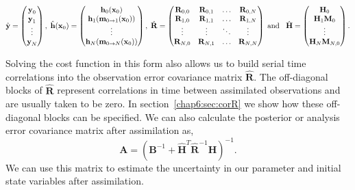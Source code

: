 \begin{equation}
\hat{\textbf{y}}=
\begin{pmatrix}
\textbf{y}_0 \\
\textbf{y}_1\\
\vdots \\
\textbf{y}_N
\end{pmatrix},
\hspace{1mm}
\hat{\textbf{h}}(\textbf{x}_0)=
\begin{pmatrix}
\textbf{h}_0(\textbf{x}_0) \\
\textbf{h}_1(\textbf{m}_{0\rightarrow 1}(\mathbf{x}_{0}))\\
\vdots \\
\textbf{h}_N(\textbf{m}_{0\rightarrow N}(\mathbf{x}_{0}))
\end{pmatrix},
\hspace{1mm}
\hat{\mathbf{R}}=
\begin{pmatrix}
\mathbf{R}_{0, 0} & \mathbf{R}_{0, 1} & \dots & \mathbf{R}_{0, N} \\
\mathbf{R}_{1, 0} & \mathbf{R}_{1, 1} & \dots & \mathbf{R}_{1, N} \\
\vdots & \vdots & \ddots & \vdots \\
\mathbf{R}_{N, 0} & \mathbf{R}_{N, 1} & \dots & \mathbf{R}_{N, N}
\end{pmatrix}
\hspace{1mm} \text{and} \hspace{3mm}
\hat{\mathbf{H}}=
\begin{pmatrix}
\mathbf{H}_0 \\
\mathbf{H}_1\mathbf{M}_0\\
\vdots \\
\mathbf{H}_N\mathbf{M}_{N,0}
\end{pmatrix}.
\end{equation}

Solving the cost function in this form also allows us to build serial time correlations into the observation error covariance matrix $\hat{\mathbf{R}}$. The off-diagonal blocks of $\hat{\mathbf{R}}$ represent correlations in time between assimilated observations and are usually taken to be zero. In section~\ref{chap6:sec:corR} we show how these off-diagonal blocks can be specified. We can also calculate the posterior or analysis error covariance matrix after assimilation as,
\begin{equation}
\mathbf{A} = (\textbf{B}^{-1} + \hat{\mathbf{H}}^{T}\hat{\textbf{R}}^{-1}\hat{\mathbf{H}})^{-1}. \label{chap6:eqn:Amat}
\end{equation}
We can use this matrix to estimate the uncertainty in our parameter and initial state variables after assimilation.

